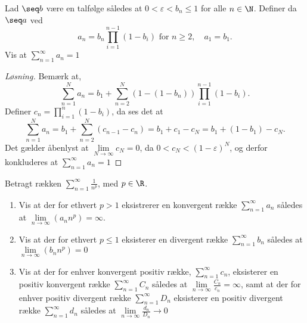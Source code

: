 \begin{opg}
Lad $ \seq b $ være en talfølge således at $ 0<\varepsilon<b_n\leq 1 $ for alle $ n\in\N $. Definer da $ \seq a $ ved \begin{equation*}
a_n=b_n\prod_{i=1}^{n-1}(1-b_i)\text{ for }n\geq 2,\quad a_1=b_1.
\end{equation*}
Vis at $ \sum_{n=1}^{\infty}a_n=1 $
\end{opg}
\begin{proof}[Løsning]
	Bemærk at, \begin{equation}
	\sum_{n=1}^{N}a_n=b_1+\sum_{n=2}^{N}(1-(1-b_n))\prod_{i=1}^{n-1}(1-b_i).
	\end{equation}
	Definer $ c_n=\prod_{i=1}^{n}(1-b_i) $, da ses det at\begin{equation}
	\sum_{n=1}^{N}a_n=b_1+\sum_{n=2}^{N}(c_{n-1}-c_n)=b_1+c_1-c_N=b_1+(1-b_1)-c_N.
	\end{equation}
	Det gælder åbenlyst at $ \lim\limits_{N\to\infty}c_N=0 $, da $ 0<c_N<(1-\varepsilon)^N $, og derfor konkluderes at $ \sum_{n=1}^{\infty}a_n=1 $
\end{proof}

\begin{opg}
	Betragt rækken $ \sum_{n=1}^{\infty}\frac{1}{n^p} $, med $ p\in\R $.
	\begin{enumerate}
		\item  Vis at der for ethvert $ p>1 $ eksistrerer en konvergent række $ \sum_{n=1}^{\infty}a_n $ således at $ \lim\limits_{n\to\infty}(a_n n^p)=\infty $.
		\item Vis at der for ethvert $ p\leq 1 $ eksisterer en divergent række $ \sum_{n=1}^{\infty}b_n $ således at $ \lim\limits_{n\to\infty}(b_n n^p)=0 $
		\item Vis at der for enhver konvergent positiv række, $ \sum_{n=1}^{\infty}c_n $, eksisterer en positiv konvergent række $ \sum_{n=1}^{\infty}C_n $ således at $ \lim\limits_{n\to\infty}\frac{C_n}{c_n}=\infty $, samt at der for enhver positiv divergent række $ \sum_{n=1}^{\infty}D_n $ eksisterer en positiv divergent række $ \sum_{n=1}^{\infty}d_n $ således at $ \lim\limits_{n\to\infty}\frac{d_n}{D_n}\to 0 $
	\end{enumerate}
	
\end{opg}